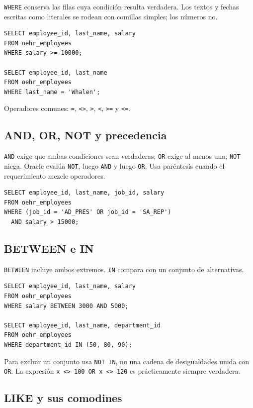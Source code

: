 \documentclass[11pt,a4paper]{article}
\newcommand{\campo}[1]{\texttt{#1}}
\begin{document}
\campo{WHERE} conserva las filas cuya condición resulta verdadera. Los textos y fechas escritas como
literales se rodean con comillas simples; los números no.

\begin{lstlisting}
SELECT employee_id, last_name, salary
FROM oehr_employees
WHERE salary >= 10000;

SELECT employee_id, last_name
FROM oehr_employees
WHERE last_name = 'Whalen';
\end{lstlisting}

Operadores comunes: \campo{=}, \campo{<>}, \campo{>}, \campo{<}, \campo{>=} y \campo{<=}.

\subsection{AND, OR, NOT y precedencia}

\campo{AND} exige que ambas condiciones sean verdaderas; \campo{OR} exige al menos una;
\campo{NOT} niega. Oracle evalúa \campo{NOT}, luego \campo{AND} y luego \campo{OR}. Usa paréntesis
cuando el requerimiento mezcle operadores.

\begin{lstlisting}
SELECT employee_id, last_name, job_id, salary
FROM oehr_employees
WHERE (job_id = 'AD_PRES' OR job_id = 'SA_REP')
  AND salary > 15000;
\end{lstlisting}

\subsection{BETWEEN e IN}

\campo{BETWEEN} incluye ambos extremos. \campo{IN} compara con un conjunto de alternativas.

\begin{lstlisting}
SELECT employee_id, last_name, salary
FROM oehr_employees
WHERE salary BETWEEN 3000 AND 5000;

SELECT employee_id, last_name, department_id
FROM oehr_employees
WHERE department_id IN (50, 80, 90);
\end{lstlisting}

Para excluir un conjunto usa \campo{NOT IN}, no una cadena de desigualdades unida con \campo{OR}.
La expresión \campo{x <> 100 OR x <> 120} es prácticamente siempre verdadera.

\subsection{LIKE y sus comodines}
\end{document}
